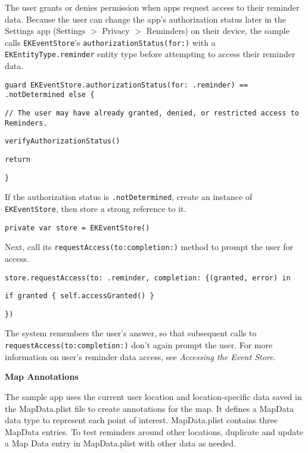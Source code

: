 \documentclass{article}
\begin{document}
\noindent
The user grants or denies permission when apps request access to their reminder data. Because the user can change the app's authorization status later in the Settings app (Settings $>$ Privacy $>$ Reminders) on their device, the sample calls \texttt{EKEventStore}'s \texttt{authorizationStatus(for:)} with a \texttt{EKEntityType.reminder} entity type before attempting to access their reminder data.

\noindent
\texttt{guard EKEventStore.authorizationStatus(for: .reminder) == .notDetermined else \{}

\noindent
\texttt{// The user may have already granted, denied, or restricted access to Reminders.}

\noindent
\texttt{verifyAuthorizationStatus()}

\noindent
\texttt{return}

\noindent
\texttt{\}}

\noindent
If the authorization status is \texttt{.notDetermined}, create an instance of \texttt{EKEventStore}, then store a strong reference to it.

\noindent
\texttt{private var store = EKEventStore()}

\noindent
Next, call its \texttt{requestAccess(to:completion:)} method to prompt the user for access.

\noindent
\texttt{store.requestAccess(to: .reminder, completion: \{(granted, error) in}

\noindent
\texttt{if granted \{ self.accessGranted() \}}

\noindent
\texttt{\})}

\noindent
The system remembers the user's answer, so that subsequent calls to \texttt{requestAccess(to:completion:)} don't again prompt the user. For more information on user's reminder data access, see \textit{Accessing the Event Store}.

\noindent
\textbf{Map Annotations}

\noindent
The sample app uses the current user location and location-specific data saved in the MapData.plist file to create annotations for the map. It defines a MapData data type to represent each point of interest. MapData.plist contains three MapData entries. To test reminders around other locations, duplicate and update a Map Data entry in MapData.plist with other data as needed.

\noindent
{}
\end{document}
